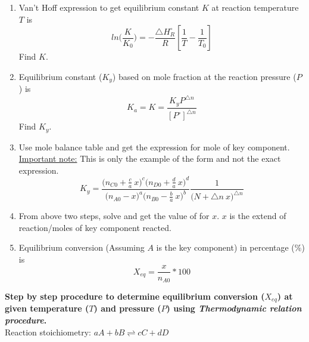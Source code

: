 \documentclass[a4paper,10pt]{article}
\begin{document}
\begin{enumerate}
    \item Van't Hoff expression to get equilibrium constant $K$ at reaction temperature $T$ is $$ ln \bigg(\frac{K}{K_0}\bigg)= -\frac{\triangle H_R^{\circ}}{R} \left[ \frac{1}{T}-\frac{1}{T_0} \right]$$Find $K$.
    
    \item Equilibrium constant ($K_y$) based on mole fraction at the reaction pressure ($P$) is $$K_a=K=\frac{K_y P^{\triangle n}}{[P^{\circ}]^{\triangle n}}$$ Find $K_y$.
    
    \item Use mole balance table and get the expression for mole of key component.\\\underline{Important note:} This is only the example of the form and not the exact expression.$$K_y=\frac{\bigg( n_{C0} + \frac{c}{a}\ x \bigg)^c \bigg(n_{D0} + \frac{d}{a}\ x\bigg)^d}{\bigg(n_{A0} - x \bigg)^a \bigg( n_{B0} - \frac{b}{a}\ x \bigg)^b}\frac{1}{\bigg( N+\triangle n\ x \bigg)^{\triangle n}}$$
    
    \item From above two steps, solve and get the value of for $x$. $x$ is the extend of reaction/moles of key component reacted.
    
    \item Equilibrium conversion (Assuming $A$ is the key component) in percentage (\%) is $$\boxed{X_{eq}=\frac{x}{n_{A0}}*100}$$
\end{enumerate}
\newpage
\textbf{Step by step procedure to determine equilibrium conversion ($X_{eq}$) at given temperature ($T$) and pressure ($P$) using \emph{Thermodynamic relation procedure}.}\\[0.5 cm]
Reaction stoichiometry: $a A + b B \rightleftharpoons c C + d D$\\
\end{document}
